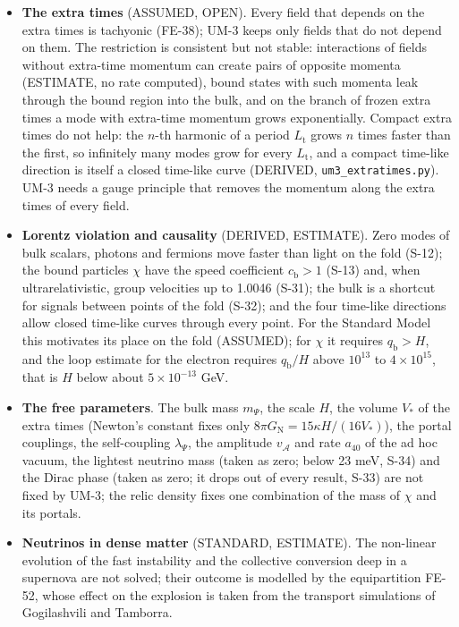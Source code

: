 \documentclass[
  10pt,
]{article}
\begin{document}
\begin{itemize}
  couplings of the fold, the left-handed Higgs portal among them,
  produce ghosts, so UM-3 with them is not unitary; chirality-blind
  couplings are necessary for unitarity but not shown to be sufficient.
\item
  \textbf{The extra times} (ASSUMED, OPEN). Every field that depends on
  the extra times is tachyonic (FE-38); UM-3 keeps only fields that do
  not depend on them. The restriction is consistent but not stable:
  interactions of fields without extra-time momentum can create pairs of
  opposite momenta (ESTIMATE, no rate computed), bound states with such
  momenta leak through the bound region into the bulk, and on the branch
  of frozen extra times a mode with extra-time momentum grows
  exponentially. Compact extra times do not help: the \(n\)-th harmonic
  of a period \(L_{\mathrm{t}}\) grows \(n\) times faster than the
  first, so infinitely many modes grow for every \(L_{\mathrm{t}}\), and
  a compact time-like direction is itself a closed time-like curve
  (DERIVED, \texttt{um3\_extratimes.py}). UM-3 needs a gauge principle
  that removes the momentum along the extra times of every field.
\item
  \textbf{Lorentz violation and causality} (DERIVED, ESTIMATE). Zero
  modes of bulk scalars, photons and fermions move faster than light on
  the fold (S-12); the bound particles \(\chi\) have the speed
  coefficient \(c_{\mathrm{b}} > 1\) (S-13) and, when ultrarelativistic,
  group velocities up to 1.0046 (S-31); the bulk is a shortcut for
  signals between points of the fold (S-32); and the four time-like
  directions allow closed time-like curves through every point. For the
  Standard Model this motivates its place on the fold (ASSUMED); for
  \(\chi\) it requires \(q_{\mathrm{b}} > H\), and the loop estimate for
  the electron requires \(q_{\mathrm{b}}/H\) above \(10^{13}\) to
  \(4\times10^{15}\), that is \(H\) below about \(5\times10^{-13}\) GeV.
\item
  \textbf{The free parameters}. The bulk mass \(m_\Psi\), the scale
  \(H\), the volume \(V_*\) of the extra times (Newton's constant fixes
  only \(8\pi G_{\mathrm{N}} = 15\kappa H/(16V_*)\)), the portal
  couplings, the self-coupling \(\lambda_\Psi\), the amplitude
  \(v_{\mathcal{A}}\) and rate \(a_{40}\) of the ad hoc vacuum, the
  lightest neutrino mass (taken as zero; below 23 meV, S-34) and the
  Dirac phase (taken as zero; it drops out of every result, S-33) are
  not fixed by UM-3; the relic density fixes one combination of the mass
  of \(\chi\) and its portals.
\item
  \textbf{Neutrinos in dense matter} (STANDARD, ESTIMATE). The
  non-linear evolution of the fast instability and the collective
  conversion deep in a supernova are not solved; their outcome is
  modelled by the equipartition FE-52, whose effect on the explosion is
  taken from the transport simulations of Gogilashvili and Tamborra.
\end{itemize}
\end{document}
